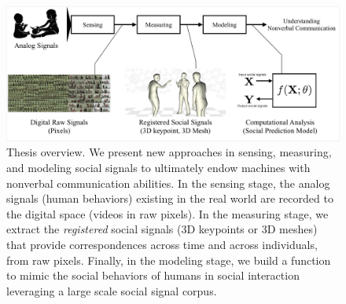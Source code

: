 

%

\begin{figure}[t]
	\centering
	\includegraphics[trim=3 3 3 3, clip=true, width=\textwidth]{figures/overview_threeStages.pdf}
	\caption{Thesis overview. We present new approaches in sensing, measuring, and modeling social signals to ultimately endow machines with nonverbal communication abilities. In the sensing stage, the analog signals (human behaviors) existing in the real world are recorded to the digital space (videos in raw pixels). In the measuring stage, we extract the \emph{registered} social signals (3D keypoints or 3D meshes) that provide correspondences across time and across individuals, from raw pixels. Finally, in the modeling stage, we build a function to mimic the social behaviors of humans in social interaction leveraging a large scale social signal corpus.}	
	\label{fig:thesis_overview}
\end{figure}


